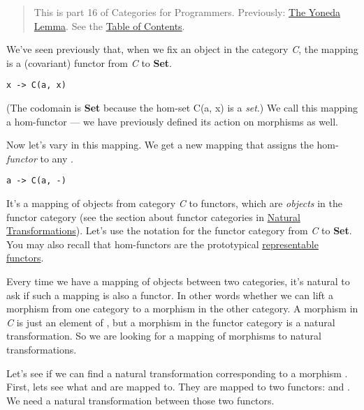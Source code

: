 \begin{quote}
This is part 16 of Categories for Programmers. Previously:
\href{https://bartoszmilewski.com/2015/09/01/the-yoneda-lemma/}{The
Yoneda Lemma}. See the
\href{https://bartoszmilewski.com/2014/10/28/category-theory-for-programmers-the-preface/}{Table
of Contents}.
\end{quote}

We've seen previously that, when we fix an object  in the
category \emph{C}, the mapping  is a (covariant)
functor from \emph{C} to \textbf{Set}.

\begin{verbatim}
x -> C(a, x)
\end{verbatim}

(The codomain is \textbf{Set} because the hom-set C(a, x) is a
\emph{set}.) We call this mapping a hom-functor --- we have previously
defined its action on morphisms as well.

Now let's vary  in this mapping. We get a new mapping that
assigns the hom-\emph{functor}  to any .

\begin{verbatim}
a -> C(a, -)
\end{verbatim}

It's a mapping of objects from category \emph{C} to functors, which are
\emph{objects} in the functor category (see the section about functor
categories in
\href{https://bartoszmilewski.com/2015/04/07/natural-transformations/}{Natural
Transformations}). Let's use the notation \code{{[}C,\ Set{]}} for the
functor category from \emph{C} to \textbf{Set}. You may also recall that
hom-functors are the prototypical
\href{https://bartoszmilewski.com/2015/07/29/representable-functors/}{representable
functors}.

Every time we have a mapping of objects between two categories, it's
natural to ask if such a mapping is also a functor. In other words
whether we can lift a morphism from one category to a morphism in the
other category. A morphism in \emph{C} is just an element of
, but a morphism in the functor category
\code{{[}C,\ Set{]}} is a natural transformation. So we are looking
for a mapping of morphisms to natural transformations.

Let's see if we can find a natural transformation corresponding to a
morphism . First, lets see what
 and  are mapped to. They are mapped to two
functors:  and . We need a natural
transformation between those two functors.

